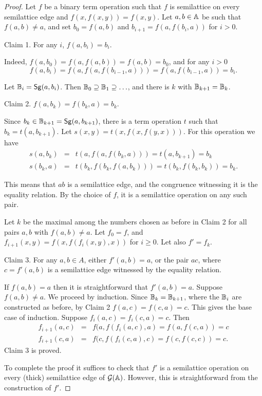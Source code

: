 \documentclass[11pt]{article}
\begin{document}
\begin{proof}
Let $f$ be a binary term operation such that $f$ is semilattice on every 
semilattice edge and $f(x, f(x, y)) = f(x, y)$. Let $a, b\in {\mathbb A}$ be such that
$f(a, b)\ne a$, and set $b_0 = f(a, b)$ and $b_{i+1} = f(a, f(b_i, a))$
for $i > 0$.

\medskip

{\sc Claim 1.} 
For any $i$, $f(a, b_i) = b_i$.

\smallskip

Indeed, $f(a, b_0) = f(a, f(a, b)) = f(a, b) = b_0$, and for any $i > 0$
$$
f(a, b_i) = f(a, f(a, f(b_{i-1}, a))) = f(a, f(b_{i-1}, a)) = b_i.
$$

Let ${\mathbb B}_i = {\sf Sg}(a, b_i)$. Then ${\mathbb B}_0\supseteq {\mathbb B}_1\supseteq\ldots$, and there is $k$
with ${\mathbb B}_{k+1} = {\mathbb B}_k$.

\medskip

{\sc Claim 2.}
$f(a, b_k) = f(b_k, a) = b_k$.

\smallskip

Since $b_k\in {\mathbb B}_{k+1} = {\sf Sg}(a, b_{k+1})$, there is a term operation
$t$ such that $b_k = t(a, b_{k+1})$. Let $s(x, y) =
t(x, f(x, f(y, x)))$. For this operation we have
\begin{eqnarray*}
s(a, b_k) &=& t(a, f(a, f(b_k, a))) = t(a, b_{k+1}) = b_k\\
s(b_k, a) &=& t(b_k, f(b_k, f(a, b_k))) = t(b_k, f(b_k, b_k)) = b_k.
\end{eqnarray*}

This means that $ab$ is a semilattice edge, and the congruence witnessing
it is the equality relation. By the choice of $f$, it is a
semilattice operation on any such pair.

Let $k$ be the maximal among the numbers chosen as before
in Claim 2 for all pairs $a, b$ with $f(a, b)\ne a$. Let $f_0 = f$,
and $f_{i+1}(x, y) = f(x, f(f_i(x, y), x))$ for $i\ge 0$. Let also
$f' = f_k$.

\medskip

{\sc Claim 3.} For any $a, b\in A$, either $f'(a, b) = a$, or the
pair $ac$, where $c = f'(a, b)$ is a semilattice edge witnessed by the
equality relation.

\smallskip

If $f(a, b) = a$ then it is straightforward that $f'(a, b) = a$.
Suppose $f(a, b)\ne a$. We proceed by induction. Since
${\mathbb B}_k = {\mathbb B}_{k+1}$, where the ${\mathbb B}_i$ are constructed as before,
by Claim 2 $f(a, c) = f(c, a) = c$. This gives the base case
of induction. Suppose $f_i(a, c) = f_i(c, a) = c$. Then
\begin{eqnarray*}
f_{i+1}(a, c) &=& f(a, f(f_i(a, c), a) = f(a, f(c, a)) = c\\
f_{i+1}(c, a) &=& f(c, f(f_i(c, a), c) = f(c, f(c, c)) = c.
\end{eqnarray*}
Claim 3 is proved.

\smallskip

To complete the proof it suffices to check that $f'$ is a
semilattice operation on every (thick) semilattice edge of ${\mathcal G}({\mathbb A})$.
However, this is straightforward from the construction of
$f'$.
\end{proof}
\end{document}
